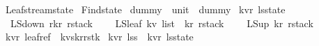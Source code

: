 %
\begin{isabellebody}%
%
%
\isadelimtheory
%
\endisadelimtheory
%
\isatagtheory
{}\isamarkupfalse%
\ Leaf{\isacharunderscore}stream{\isacharunderscore}state\isanewline
{}\ Find{\isacharunderscore}state\isanewline
{}%
\endisatagtheory
{\isafoldtheory}%
%
\isadelimtheory
\isanewline
%
\endisadelimtheory
\isanewline
\isanewline
\isanewline
{}\isamarkupfalse%
\ dummy\ {\isacharcolon}{\isacharcolon}\ {\isachardoublequoteopen}unit{\isachardoublequoteclose}\ \ {\isachardoublequoteopen}dummy{\isacharequal}{\isacharparenleft}{\isacharparenright}{\isachardoublequoteclose}\isanewline
\isanewline
\isanewline
\isanewline
\isanewline
\isanewline
{}\isamarkupfalse%
\ {\isacharparenleft}{\isacharprime}k{\isacharcomma}{\isacharprime}v{\isacharcomma}{\isacharprime}r{\isacharparenright}\ ls{\isacharunderscore}state\ {\isacharequal}\ \isanewline
\ \ LS{\isacharunderscore}down\ {\isachardoublequoteopen}{\isacharprime}r{\isacharasterisk}{\isacharparenleft}{\isacharprime}k{\isacharcomma}{\isacharprime}r{\isacharparenright}\ rstack{\isachardoublequoteclose}\ \isanewline
\ \ {\isacharbar}\ LS{\isacharunderscore}leaf\ {\isachardoublequoteopen}{\isacharparenleft}{\isacharprime}k{\isacharasterisk}{\isacharprime}v{\isacharparenright}\ list\ {\isacharasterisk}\ {\isacharparenleft}{\isacharprime}k{\isacharcomma}{\isacharprime}r{\isacharparenright}\ rstack{\isachardoublequoteclose}\ \isanewline
\ \ {\isacharbar}\ LS{\isacharunderscore}up\ {\isachardoublequoteopen}{\isacharparenleft}{\isacharprime}k{\isacharcomma}{\isacharprime}r{\isacharparenright}\ rstack{\isachardoublequoteclose}\isanewline
\ \ \isanewline
\isanewline
\isanewline
{}\isamarkupfalse%
\ {\isacharparenleft}{\isacharprime}k{\isacharcomma}{\isacharprime}v{\isacharcomma}{\isacharprime}r{\isacharparenright}\ leaf{\isacharunderscore}ref\ {\isacharequal}\ {\isachardoublequoteopen}{\isacharparenleft}{\isacharprime}k{\isacharasterisk}{\isacharprime}v{\isacharparenright}s{\isacharasterisk}{\isacharparenleft}{\isacharprime}k{\isacharcomma}{\isacharprime}r{\isacharparenright}rstk{\isachardoublequoteclose}\isanewline
\isanewline
{}\isamarkupfalse%
\ {\isacharparenleft}{\isacharprime}k{\isacharcomma}{\isacharprime}v{\isacharcomma}{\isacharprime}r{\isacharparenright}\ lss\ {\isacharequal}\ {\isachardoublequoteopen}{\isacharparenleft}{\isacharprime}k{\isacharcomma}{\isacharprime}v{\isacharcomma}{\isacharprime}r{\isacharparenright}\ ls{\isacharunderscore}state{\isachardoublequoteclose}\isanewline

\end{isabellebody}
